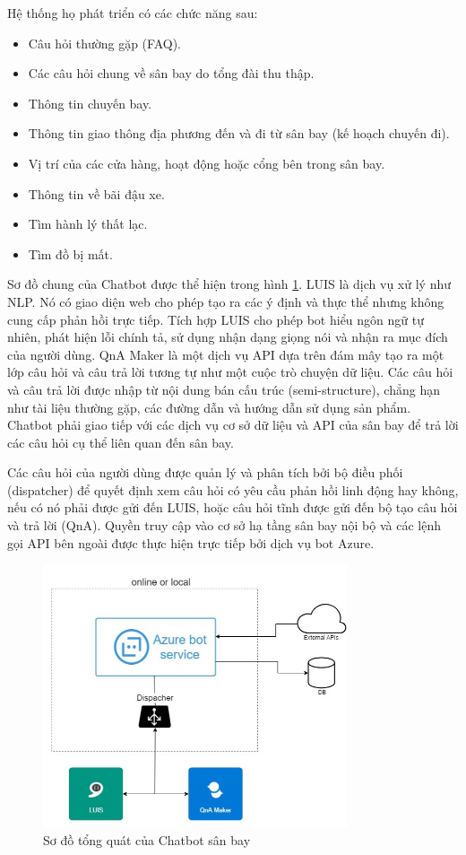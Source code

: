 Hệ thống họ phát triển có các chức năng sau:

\begin{itemize}
    \item Câu hỏi thường gặp (FAQ).
    \item Các câu hỏi chung về sân bay do tổng đài thu thập.
    \item Thông tin chuyến bay.
    \item Thông tin giao thông địa phương đến và đi từ sân bay
    (kế hoạch chuyến đi).
    \item Vị trí của các cửa hàng, hoạt động hoặc cổng bên trong
    sân bay.
    \item Thông tin về bãi đậu xe.
    \item Tìm hành lý thất lạc.
    \item Tìm đồ bị mất.
\end{itemize}

Sơ đồ chung của Chatbot được thể hiện trong hình \ref{fig:airportarch}.
LUIS là dịch vụ xử lý như NLP. Nó có giao diện web cho phép tạo ra các
ý định và thực thể nhưng không cung cấp phản hồi trực tiếp. Tích hợp
LUIS cho phép bot hiểu ngôn ngữ tự nhiên, phát hiện lỗi chính tả,
sử dụng nhận dạng giọng nói và nhận ra mục đích của người dùng. QnA
Maker là một dịch vụ API dựa trên đám mây tạo ra một lớp câu hỏi và
câu trả lời tương tự như một cuộc trò chuyện dữ liệu. Các câu hỏi và
câu trả lời được nhập từ nội dung bán cấu trúc (semi-structure),
chẳng hạn như tài liệu thường gặp, các đường dẫn và hướng dẫn sử dụng
sản phẩm. Chatbot phải giao tiếp với các dịch vụ cơ sở dữ liệu và API
của sân bay để trả lời các câu hỏi cụ thể liên quan đến sân bay.

Các câu hỏi của người dùng được quản lý và phân tích bởi bộ điều phối
(dispatcher) để quyết định xem câu hỏi có yêu cầu phản hồi linh động
hay không, nếu có nó phải được gửi đến LUIS, hoặc câu hỏi tĩnh được
gửi đến bộ tạo câu hỏi và trả lời (QnA). Quyền truy cập vào cơ sở
hạ tầng sân bay nội bộ và các lệnh gọi API bên ngoài được thực hiện
trực tiếp bởi dịch vụ bot Azure.

\begin{figure}[ht]
    \centering
    \includegraphics[width=0.8\textwidth]{thesis/chatbot/congtrinh/img/airportarch.png}
    \caption{Sơ đồ tổng quát của Chatbot sân bay}
    \label{fig:airportarch}
\end{figure}

